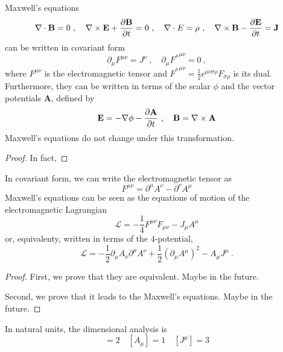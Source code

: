     Maxwell's equations 
    \begin{equation}\label{eqmax}
        \nabla \cdot \mathbf B = 0 ~, \quad \nabla \times \mathbf E + \frac{\partial\mathbf B}{\partial t} = 0 ~, \quad \nabla \cdot E = \rho ~, \quad \nabla \times \mathbf B - \frac{\partial\mathbf E}{\partial t} = \mathbf J 
    \end{equation}
    can be written in covariant form 
    \begin{equation*}
        \partial_\mu F^{\mu\nu} = J^\nu ~, \quad \partial_\mu {F^*}^{\mu\nu} = 0 ~,
    \end{equation*}
    where $F^{\mu\nu}$ is the electromagnetic tensor and ${F^*}^{\mu\nu} = \frac{1}{2} \epsilon^{\mu\nu\sigma\rho} F_{\sigma\rho}$ is its dual. 
    Furthermore, they can be written in terms of the scalar $\phi$ and the vector potentials $\mathbf A$, defined by
    \begin{equation*}
        \mathbf E = - \nabla \phi - \frac{\partial\mathbf A}{\partial t} ~, \quad \mathbf B = \nabla \times \mathbf A
    \end{equation*}
    Maxwell's equations do not change under this transformation. 
    \begin{proof}
       In fact, 
    \end{proof}
    In covariant form, we can write the electromagnetic tensor as 
    \begin{equation*}
        F^{\mu\nu} = \partial^\mu A^\nu - \partial^\nu A^\mu
    \end{equation*}
    Maxwell's equations can be seen as the equations of motion of the electromagnetic Lagrangian 
    \begin{equation*}
        \mathcal L = - \frac{1}{4} F^{\mu\nu} F_{\mu\nu} - J_\mu A^\mu
    \end{equation*}
    or, equivalenty, written in terms of the $4$-potential, 
    \begin{equation*}
        \mathcal L = - \frac{1}{2} \partial_\mu A_\nu \partial^\mu A^\nu + \frac{1}{2} (\partial_\mu A^\mu) ^2 - A_\mu J^\mu ~.
    \end{equation*}

    \begin{proof}
        First, we prove that they are equivalent.
        Maybe in the future. 

        Second, we prove that it leads to the Maxwell's equations.
        Maybe in the future.
    \end{proof}

    In natural units, the dimensional analysis is 
    \begin{equation*}
        [F^{\mu\nu}] = 2 \quad [A_\mu] = 1 \quad [J^\mu] = 3
    \end{equation*}

